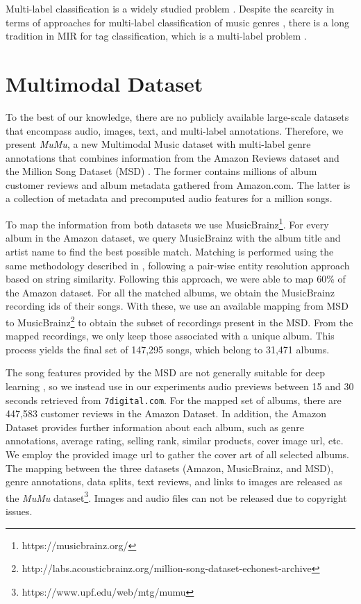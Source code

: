 \documentclass{article}
\begin{document}
Multi-label classification is a widely studied problem \cite{tsoumakas2006multi,jain2016extreme}. 
Despite the scarcity in terms of approaches for multi-label classification of music genres \cite{Sanden2011,wang2009tag}, there is a long tradition in MIR for tag classification, which is a multi-label problem \cite{Choi2016,wang2009tag}.

\section{Multimodal Dataset}\label{sec:mumu}

To the best of our knowledge, there are no publicly available large-scale datasets that encompass audio, images, text, and multi-label annotations. Therefore, we present \emph{MuMu}, a new Multimodal Music dataset with multi-label genre annotations that combines information from the Amazon Reviews dataset \cite{mcauley2015image} and the Million Song Dataset (MSD) \cite{Bertin-Mahieux2011}. 
The former contains millions of album customer reviews and album metadata gathered from Amazon.com. 
The latter is a collection of metadata and precomputed audio features for a million songs. 

To map the information from both datasets we use MusicBrainz\footnote{https://musicbrainz.org/}. 
For every album in the Amazon dataset, we query MusicBrainz with the album title and artist name to find the best possible match. Matching is performed using the same methodology described in \cite{Oramas2015b}, following a pair-wise entity resolution approach based on string similarity. Following this approach, we were able to map 60\% of the Amazon dataset.
For all the matched albums, we obtain the MusicBrainz recording ids of their songs. 
With these, we use an available mapping from MSD to MusicBrainz\footnote{http://labs.acousticbrainz.org/million-song-dataset-echonest-archive} to obtain the subset of recordings present in the MSD. 
From the mapped recordings, we only keep those associated with a unique album.
This process yields the final set of 147,295 songs, which belong to 31,471 albums.

The song features provided by the MSD are not generally suitable for deep learning \cite{Oord2013}, so we instead use in our experiments audio previews between 15 and 30 seconds retrieved from \texttt{7digital.com}.
For the mapped set of albums, there are 447,583 customer reviews in the Amazon Dataset. 
In addition, the Amazon Dataset provides further information about each album, such as genre annotations, average rating, selling rank, similar products, cover image url, etc. 
We employ the provided image url to gather the cover art of all selected albums. 
The mapping between the three datasets (Amazon, MusicBrainz, and MSD), genre annotations, data splits, text reviews, and links to images are released as the \emph{MuMu} dataset\footnote{https://www.upf.edu/web/mtg/mumu}. Images and audio files can not be released due to copyright issues.
\end{document}
